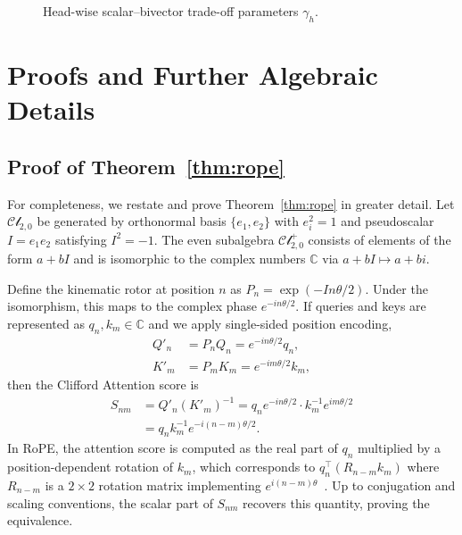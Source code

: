 \documentclass{article}
\theoremstyle{plain}
\theoremstyle{definition}
\theoremstyle{remark}
\newcommand{\cliff}{\mathcal{Cl}}
\newcommand{\C}{\mathbb{C}}
\begin{document}
\begin{figure}[h]
\centering
{}
\caption{Head-wise scalar--bivector trade-off parameters $\gamma_h$.}
\label{fig:gamma_hist}
\end{figure}

\section{Proofs and Further Algebraic Details}

\subsection{Proof of Theorem~\ref{thm:rope}}

For completeness, we restate and prove Theorem~\ref{thm:rope} in greater detail. Let $\cliff_{2,0}$ be generated by orthonormal basis $\{e_1,e_2\}$ with $e_i^2=1$ and pseudoscalar $I=e_1 e_2$ satisfying $I^2=-1$. The even subalgebra $\cliff^+_{2,0}$ consists of elements of the form $a + bI$ and is isomorphic to the complex numbers $\C$ via $a+bI \mapsto a+bi$.

Define the kinematic rotor at position $n$ as $P_n = \exp(-In\theta/2)$. Under the isomorphism, this maps to the complex phase $e^{-in\theta/2}$. If queries and keys are represented as $q_n,k_m\in\C$ and we apply single-sided position encoding,
\begin{align}
    Q'_n &= P_n Q_n = e^{-in\theta/2} q_n,\\
    K'_m &= P_m K_m = e^{-im\theta/2} k_m,
\end{align}
then the Clifford Attention score is
\begin{align}
    S_{nm} &= Q'_n (K'_m)^{-1} = q_n e^{-in\theta/2} \cdot k_m^{-1} e^{im\theta/2}\\
           &= q_n k_m^{-1} e^{-i(n-m)\theta/2}.
\end{align}
In RoPE, the attention score is computed as the real part of $q_n$ multiplied by a position-dependent rotation of $k_m$, which corresponds to $q_n^\top (R_{n-m}k_m)$ where $R_{n-m}$ is a $2\times2$ rotation matrix implementing $e^{i(n-m)\theta}$~\cite{su2024roformer}. Up to conjugation and scaling conventions, the scalar part of $S_{nm}$ recovers this quantity, proving the equivalence.
\end{document}
